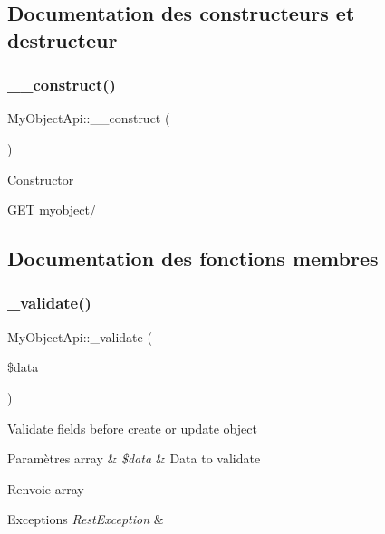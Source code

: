 \subsection{Documentation des constructeurs et destructeur}
\mbox{\label{classMyObjectApi_a5e74de160c05563852902219228cbc65}} 
\subsubsection{\texorpdfstring{\+\_\+\+\_\+construct()}{\_\_construct()}}
{\footnotesize\ttfamily My\+Object\+Api\+::\+\_\+\+\_\+construct (\begin{DoxyParamCaption}{ }\end{DoxyParamCaption})}

Constructor

G\+ET myobject/ 

\subsection{Documentation des fonctions membres}
\mbox{\label{classMyObjectApi_adb8789082fb8928fcd2adedef3f7a681}} 
\subsubsection{\texorpdfstring{\+\_\+validate()}{\_validate()}}
{\footnotesize\ttfamily My\+Object\+Api\+::\+\_\+validate (\begin{DoxyParamCaption}\item[{}]{\$data }\end{DoxyParamCaption})}

Validate fields before create or update object


\begin{DoxyParams}[1]{Paramètres}
array & {\em \$data} & Data to validate \\
\hline
\end{DoxyParams}
\begin{DoxyReturn}{Renvoie}
array
\end{DoxyReturn}

\begin{DoxyExceptions}{Exceptions}
{\em Rest\+Exception} & \\
\hline
\end{DoxyExceptions}
\mbox{\label{classMyObjectApi_ac1e08e0702436b404e774e401603da8a}} 
